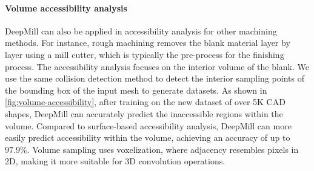 \paragraph{Volume accessibility analysis}
DeepMill can also be applied in accessibility analysis for other machining methods. For instance, rough machining removes the blank material layer by layer using a mill cutter, which is typically the pre-process for the finishing process. The accessibility analysis focuses on the interior volume of the blank. 
We use the same collision detection method to detect the interior sampling points of the bounding box of the input mesh to generate datasets. As shown in \autoref{fig:volume-accessibility}, after training on the new dataset of over 5K CAD shapes, DeepMill can accurately predict the inaccessible regions within the volume.
Compared to surface-based accessibility analysis, DeepMill can more easily predict accessibility within the volume, achieving an accuracy of up to $97.9\%$. Volume sampling uses voxelization, where adjacency resembles pixels in 2D, making it more suitable for 3D convolution operations.






